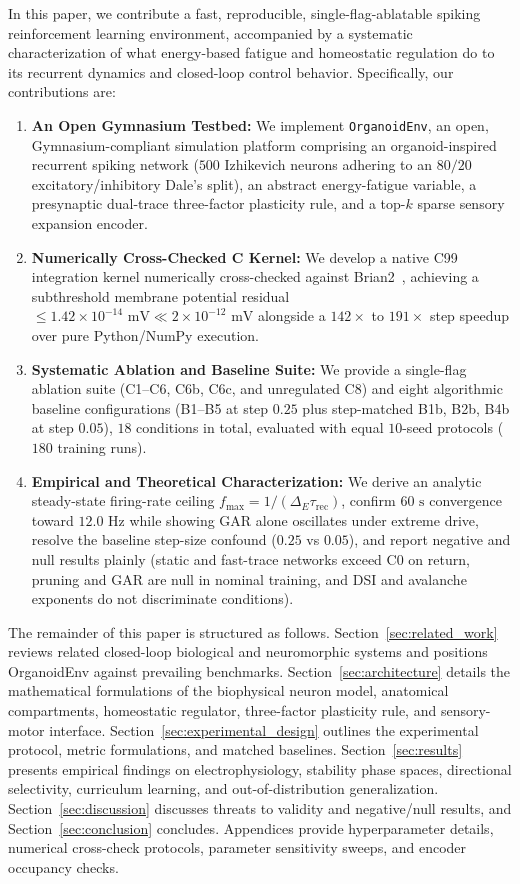 \documentclass[journal]{IEEEtran}
\begin{document}
In this paper, we contribute a fast, reproducible, single-flag-ablatable spiking reinforcement learning environment, accompanied by a systematic characterization of what energy-based fatigue and homeostatic regulation do to its recurrent dynamics and closed-loop control behavior. Specifically, our contributions are:
\begin{enumerate}
    \item \textbf{An Open Gymnasium Testbed:} We implement \texttt{OrganoidEnv}, an open, Gymnasium-compliant simulation platform comprising an organoid-inspired recurrent spiking network ($500$ Izhikevich neurons adhering to an $80/20$ excitatory/inhibitory Dale's split), an abstract energy-fatigue variable, a presynaptic dual-trace three-factor plasticity rule, and a top-$k$ sparse sensory expansion encoder.
    \item \textbf{Numerically Cross-Checked C Kernel:} We develop a native C99 integration kernel numerically cross-checked against Brian2~\cite{Stimberg2019Brian2}, achieving a subthreshold membrane potential residual $\le 1.42 \times 10^{-14}\text{ mV} \ll 2\times 10^{-12}\text{ mV}$ alongside a $142\times$ to $191\times$ step speedup over pure Python/NumPy execution.
    \item \textbf{Systematic Ablation and Baseline Suite:} We provide a single-flag ablation suite (C1--C6, C6b, C6c, and unregulated C8) and eight algorithmic baseline configurations (B1--B5 at step $0.25$ plus step-matched B1b, B2b, B4b at step $0.05$), $18$ conditions in total, evaluated with equal $10$-seed protocols ($180$ training runs).
    \item \textbf{Empirical and Theoretical Characterization:} We derive an analytic steady-state firing-rate ceiling $f_{\max} = 1/(\Delta_E \tau_{\mathrm{rec}})$, confirm $60\text{ s}$ convergence toward $12.0\text{ Hz}$ while showing GAR alone oscillates under extreme drive, resolve the baseline step-size confound ($0.25$ vs $0.05$), and report negative and null results plainly (static and fast-trace networks exceed C0 on return, pruning and GAR are null in nominal training, and DSI and avalanche exponents do not discriminate conditions).
\end{enumerate}

The remainder of this paper is structured as follows. Section~\ref{sec:related_work} reviews related closed-loop biological and neuromorphic systems and positions OrganoidEnv against prevailing benchmarks. Section~\ref{sec:architecture} details the mathematical formulations of the biophysical neuron model, anatomical compartments, homeostatic regulator, three-factor plasticity rule, and sensory-motor interface. Section~\ref{sec:experimental_design} outlines the experimental protocol, metric formulations, and matched baselines. Section~\ref{sec:results} presents empirical findings on electrophysiology, stability phase spaces, directional selectivity, curriculum learning, and out-of-distribution generalization. Section~\ref{sec:discussion} discusses threats to validity and negative/null results, and Section~\ref{sec:conclusion} concludes. Appendices provide hyperparameter details, numerical cross-check protocols, parameter sensitivity sweeps, and encoder occupancy checks.
\end{document}

